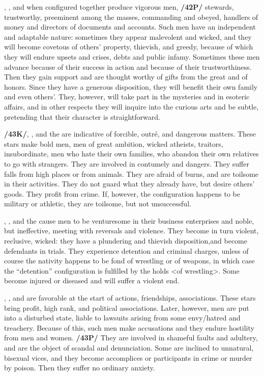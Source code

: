 \Saturn, \Jupiter, and \Mercury\xspace when configured together produce vigorous men, \textbf{/42P/} stewards,
trustworthy, preeminent among the masses, commanding and obeyed, handlers of money and directors of documents and accounts. Such men have an independent and adaptable nature: sometimes they appear malevolent and wicked, and they will become covetous of others’ property, thievish, and greedy, because of which they will endure upsets and crises, debts and public infamy. Sometimes these men advance because of their success in action and because of their trustworthiness. Then they gain support and are thought worthy of gifts from the great and of honors. Since they have a generous disposition, they will benefit their own family and even others’. They, however, will take part in the mysteries and in esoteric affairs, and in other respects they will inquire into the curious arts and be subtle,  pretending that their character is straightforward.

\textbf{/43K/}\Saturn, \Mars, and the \Sun\xspace are indicative of forcible, outré, and dangerous matters. These stars make bold men, men of great ambition, wicked atheists, traitors, insubordinate, men who hate their own families, who abandon their own relatives to go with strangers. They are involved in contumely and dangers. They suffer falls from high places or from animals. They are afraid of burns, and are toilsome in their activities. They do not guard what they already have, but desire others’ goods. They profit from
crime. If, however, the configuration happens to be military or athletic, they are toilsome, but not unsuccessful.

\Saturn, \Mars, and the \Moon\xspace cause men to be venturesome in their business enterprises and noble, but
ineffective, meeting with reversals and violence. They become in turn violent, reclusive, wicked: they have a plundering and thievish disposition,and become defendants in trials. They experience detention and criminal charges, unless of course the nativity happens to be fond of wrestling or of weapons, in which case the “detention” configuration is fulfilled by the holds <of wrestling>. Some become injured or diseased
and will suffer a violent end.

\Saturn, \Mars, and \Venus\xspace are favorable at the start of actions, friendships, associations. These stars bring profit, high rank, and political associations. Later, however, men are put into a disturbed state, liable to lawsuits arising from some envy/hatred and treachery. Because of this, such men make accusations and they endure hostility from men and women. \textbf{/43P/} They are involved in shameful faults and adultery, and are the object of scandal and denunciation. Some are inclined to unnatural, bisexual vices, and they become accomplices or participants in crime or murder by poison. Then they suffer no ordinary anxiety.

